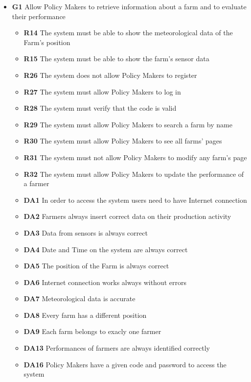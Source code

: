 \begin{itemize}   
    \item \textbf{G1} Allow Policy Makers to retrieve information about a farm and to evaluate their performance
        \begin{itemize}
            \renewcommand\labelitemi{--}
            \item \textbf{R14} The system must be able to show the meteorological data of the Farm’s position
            \item \textbf{R15} The system must be able to show the farm’s sensor data
            \item \textbf{R26} The system does not allow Policy Makers to register
            \item \textbf{R27} The system must allow Policy Makers to log in
            \item \textbf{R28} The system must verify that the code is valid
            \item \textbf{R29} The system must allow Policy Makers to search a farm by name
            \item \textbf{R30} The system must allow Policy Makers to see all farms’ pages
            \item \textbf{R31} The system must not allow Policy Makers to modify any farm’s page
            \item \textbf{R32} The system must allow Policy Makers to update the performance of a farmer
            \item \textbf{DA1} In order to access the system users need to have Internet connection
            \item \textbf{DA2} Farmers always insert correct data on their production activity
            \item \textbf{DA3} Data from sensors is always correct
            \item \textbf{DA4} Date and Time on the system are always correct
            \item \textbf{DA5} The position of the Farm is always correct
            \item \textbf{DA6} Internet connection works always without errors
            \item \textbf{DA7} Meteorological data is accurate
            \item \textbf{DA8} Every farm has a different position
            \item \textbf{DA9} Each farm belongs to exacly one farmer
            \item \textbf{DA13} Performances of farmers are always identified correctly
            \item \textbf{DA16} Policy Makers have a given code and password to access the system
        \end{itemize}
    

\end{itemize}
